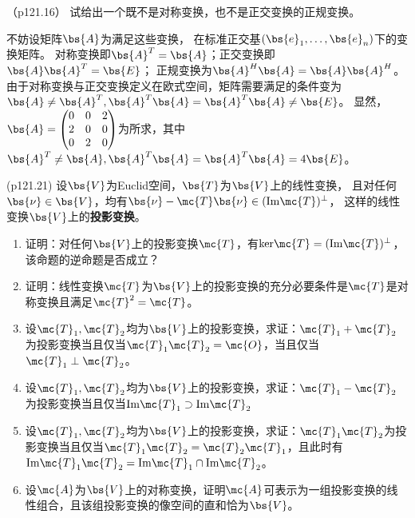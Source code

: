 \documentclass[12pt, a4paper, oneside, UTF8]{ctexbook}
\begin{document}
\begin{question}（p121.16）
    试给出一个既不是对称变换，也不是正交变换的正规变换。
\end{question}

\begin{solution}
    不妨设矩阵$\bs{A}$为满足这些变换，
    在标准正交基$(\bs{e}_1,\ldots,\bs{e}_n)$下的变换矩阵。
    对称变换即$\bs{A}^T=\bs{A}$；正交变换即$\bs{A}\bs{A}^T=\bs{E}$；
    正规变换为$\bs{A}^H\bs{A}=\bs{A}\bs{A}^H$。由于对称变换与正交变换定义在欧式空间，矩阵需要满足的条件变为
    $\bs{A}\neq \bs{A}^T,\bs{A}^T\bs{A}=\bs{A}^T\bs{A} \neq \bs{E}$。
    显然，$\bs{A}=\begin{pmatrix}
        0 & 0 & 2 \\
        2 & 0 & 0 \\
        0 & 2 & 0
    \end{pmatrix}$为所求，其中$\bs{A}^T\neq \bs{A},\bs{A}^T\bs{A}=\bs{A}^T\bs{A}=4\bs{E}$。
\end{solution}


\begin{question}(p121.21)
设$\bs{V}$为Euclid空间，$\bs{T}$为$\bs{V}$上的线性变换，
且对任何$\bs{\nu}\in \bs{V}$，均有$\bs{\nu}-\mc{T}\bs{\nu} \in (\mathrm{Im}\mc{T})^{\perp}$，
这样的线性变换$\bs{V}$上的\textbf{投影变换}。
\begin{enumerate}[label=(\arabic*)]
    \item 证明：对任何$\bs{V}$上的投影变换$\mc{T}$，有$\mathrm{ker}\mc{T}=(\mathrm{Im}\mc{T})^{\perp}$，该命题的逆命题是否成立？
    \item 证明：线性变换$\mc{T}$为$\bs{V}$上的投影变换的充分必要条件是$\mc{T}$是对称变换且满足$\mc{T}^2=\mc{T}$。
    \item 设$\mc{T}_1,\mc{T}_2$均为$\bs{V}$上的投影变换，求证：$\mc{T}_1+\mc{T}_2$为投影变换当且仅当$\mc{T}_1\mc{T}_2=\mc{O}$，当且仅当$\mc{T}_1 \perp \mc{T}_2$。
    \item 设$\mc{T}_1,\mc{T}_2$均为$\bs{V}$上的投影变换，求证：$\mc{T}_1-\mc{T}_2$为投影变换当且仅当$\mathrm{Im}\mc{T}_1 \supset \mathrm{Im}\mc{T}_2$
    \item 设$\mc{T}_1,\mc{T}_2$均为$\bs{V}$上的投影变换，求证：$\mc{T}_1\mc{T}_2$为投影变换当且仅当$\mc{T}_1\mc{T}_2=\mc{T}_2\mc{T}_1$，且此时有$\mathrm{Im}\mc{T}_1\mc{T}_2=\mathrm{Im}\mc{T}_1 \cap \mathrm{Im} \mc{T}_2$。
    \item 设$\mc{A}$为$\bs{V}$上的对称变换，证明$\mc{A}$可表示为一组投影变换的线性组合，且该组投影变换的像空间的直和恰为$\bs{V}$。
\end{enumerate}
\end{question}
\end{document}
